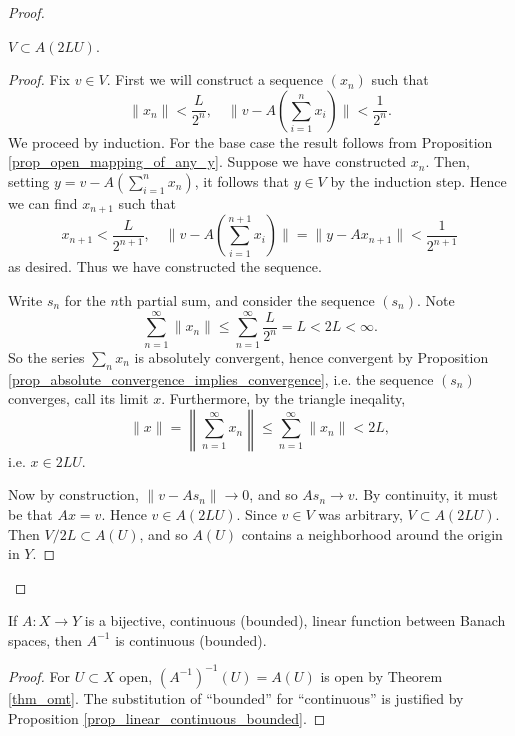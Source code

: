 \documentclass[12pt]{article}
\begin{document}
\begin{refsection}
\begin{proof}
	\begin{proposition}
		$V\subset A(2LU)$.
	\end{proposition}
	\begin{proof}
		Fix $v\in V$. First we will construct a sequence $(x_n)$ such that 
		\begin{equation*}
			\|x_n\| < \frac{L}{2^{n}},\quad \|v-A(\sum_{i=1}^n x_i)\|<\frac{1}{2^n}.
		\end{equation*}
		We proceed by induction. For the base case the result follows from Proposition \ref{prop_open_mapping_of_any_y}. Suppose we have constructed $x_n$. Then, setting $y=v-A(\sum_{i=1}^n x_n)$, it follows that $y\in V$ by the induction step. Hence we can find $x_{n+1}$ such that 
		\begin{equation*}
			x_{n+1} < \frac{L}{2^{n+1}}, \quad \|v-A(\sum_{i=1}^{n+1}x_i)\| = \|y-Ax_{n+1}\| < \frac{1}{2^{n+1}}
		\end{equation*}
		as desired. Thus we have constructed the sequence.
		
		Write $s_n$ for the $n$th partial sum, and consider the sequence $(s_n)$. Note
		\begin{equation*}
			\sum_{n=1}^\infty \|x_n\| \leq \sum_{n=1}^\infty \frac{L}{2^{n}} = L < 2L < \infty.
		\end{equation*}
		So the series $\sum_n x_n$ is absolutely convergent, hence convergent by Proposition \ref{prop_absolute_convergence_implies_convergence}, i.e. the sequence $(s_n)$ converges, call its limit $x$. Furthermore, by the triangle ineqality,
		\begin{equation*}
			\|x\|=\left\|\sum_{n=1}^\infty x_n\right\|\leq \sum_{n=1}^\infty \|x_n\| < 2L,
		\end{equation*}
		i.e. $x\in 2LU$.

		Now by construction, $\|v-As_n\|\to 0$, and so $As_n\to v$. By continuity, it must be that $Ax=v$. Hence $v\in A(2LU)$. Since $v\in V$ was arbitrary, $V\subset A(2LU)$. Then $V/2L\subset A(U)$, and so $A(U)$ contains a neighborhood around the origin in $Y$. 
	\end{proof}
\end{proof}

\begin{theorem}
\label{thm_bounded_inverse}
	If $A:X\to Y$ is a bijective, continuous (bounded), linear function between Banach spaces, then $A^{-1}$ is continuous (bounded).
\end{theorem}
\begin{proof}
	For $U\subset X$ open, $(A^{-1})^{-1}(U)=A(U)$ is open by Theorem \ref{thm_omt}. The substitution of ``bounded'' for ``continuous'' is justified by Proposition \ref{prop_linear_continuous_bounded}.
\end{proof}


\end{refsection}
\end{document}
